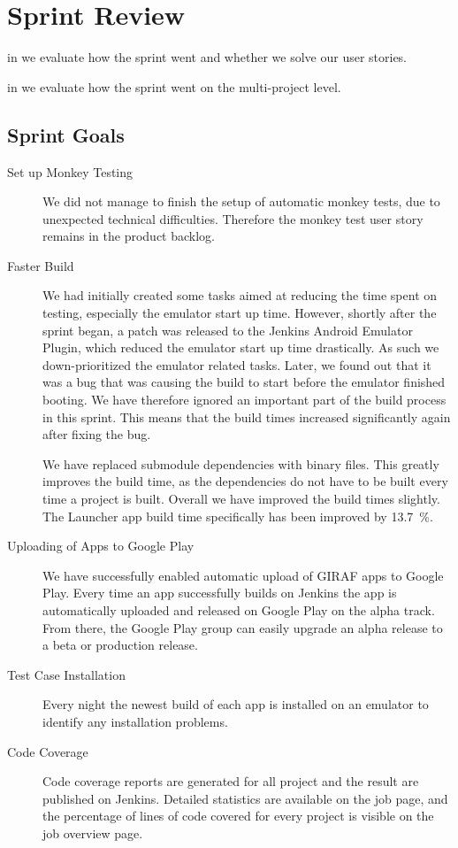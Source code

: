 \chapter{Sprint Review}\label{chap:sprint2_end}

\begin{chapterorganization}
  \item in  we evaluate how the sprint went and whether we solve our user stories.
  \item in  we evaluate how the sprint went on the multi-project level.
\end{chapterorganization}

\section{Sprint Goals}\label{sec:s2_goals}
\begin{description}
    \item[Set up Monkey Testing] We did not manage to finish the setup of automatic monkey tests, due to unexpected technical difficulties. Therefore the monkey test user story remains in the product backlog.
    \item[Faster Build] We had initially created some tasks aimed at reducing the time spent on testing, especially the emulator start up time. However, shortly after the sprint began, a patch was released to the Jenkins Android Emulator Plugin, which reduced the emulator start up time drastically. As such we down-prioritized the emulator related tasks. Later, we found out that it was a bug that was causing the build to start before the emulator finished booting. We have therefore ignored an important part of the build process in this sprint. This means that the build times increased significantly again after fixing the bug.

    We have replaced submodule dependencies with binary files. This greatly improves the build time, as the dependencies do not have to be built every time a project is built. Overall we have improved the build times slightly. The Launcher app build time specifically has been improved by \SI{13.7}{\percent}.
    \item[Uploading of Apps to Google Play] We have successfully enabled automatic upload of GIRAF apps to Google Play. Every time an app successfully builds on Jenkins the app is automatically uploaded and released on Google Play on the alpha track. From there, the Google Play group can easily upgrade an alpha release to a beta or production release.
    \item[Test Case Installation] Every night the newest build of each app is installed on an emulator to identify any installation problems.
    \item[Code Coverage] Code coverage reports are generated for all project and the result are published on Jenkins. Detailed statistics are available on the job page, and the percentage of lines of code covered for every project is visible on the job overview page.
\end{description}

